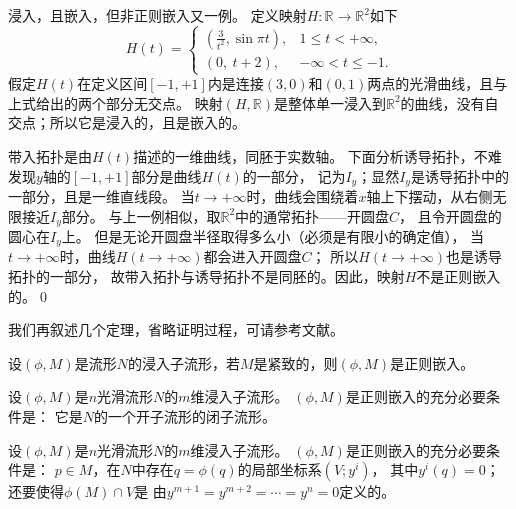 \begin{example}\label{chdm:exm_iec3}
    浸入，且嵌入，但非正则嵌入又一例。
    定义映射$H:\mathbb{R}\to \mathbb{R}^2$如下
    \begin{equation}
        H(t)=\begin{cases}
           \left(\frac{3}{t^2},\sin\pi t \right), & 1 \leqslant t < +\infty, \\
           \left(0,\ t+2\right), & -\infty < t \leqslant -1.
        \end{cases}
    \end{equation}
    假定$H(t)$在定义区间$[-1,+1]$内是连接$(3,0)$和$(0,1)$两点的光滑曲线，且与上式给出的两个部分无交点。
    映射$(H,\mathbb{R})$是整体单一浸入到$\mathbb{R}^2$的曲线，没有自交点；所以它是浸入的，且是嵌入的。
    
    带入拓扑是由$H(t)$描述的一维曲线，同胚于实数轴。
    下面分析诱导拓扑，不难发现$y$轴的$[-1,+1]$部分是曲线$H(t)$的一部分，
    记为$I_y$；显然$I_y$是诱导拓扑中的一部分，且是一维直线段。
    当$t\to +\infty$时，曲线会围绕着$x$轴上下摆动，从右侧无限接近$I_y$部分。
    与上一例相似，取$\mathbb{R}^2$中的通常拓扑——开圆盘$C$，
    且令开圆盘的圆心在$I_y$上。
    但是无论开圆盘半径取得多么小（必须是有限小的确定值），
    当$t\to +\infty$时，曲线$H(t\to +\infty)$都会进入开圆盘$C$；
    所以$H(t\to +\infty)$也是诱导拓扑的一部分，
    故带入拓扑与诱导拓扑不是同胚的。因此，映射$H$不是正则嵌入的。\qed
\end{example}

我们再叙述几个定理，省略证明过程，可请参考文献\parencite[\S 1.3]{cc2001-zh}。
\begin{theorem}\label{chdm:thm_embed-1}
    设$(\phi,M)$是流形$N$的浸入子流形，若$M$是紧致的，则$(\phi,M)$是正则嵌入。
\end{theorem}

\begin{theorem}\label{chdm:thm_embed-2}
    设$(\phi,M)$是$n$光滑流形$N$的$m$维浸入子流形。
    $(\phi,M)$是正则嵌入的充分必要条件是：
    它是$N$的一个开子流形的闭子流形。
\end{theorem}

\begin{theorem}\label{chdm:thm_embed-3}
    设$(\phi,M)$是$n$光滑流形$N$的$m$维浸入子流形。
    $(\phi,M)$是正则嵌入的充分必要条件是：
    $p\in M$，在$N$中存在$q=\phi(q)$的局部坐标系$(V;y^i)$，
    其中$y^i(q)=0$；还要使得$\phi(M)\cap V$是
    由$y^{m+1}=y^{m+2}=\cdots=y^{n}=0$定义的。
\end{theorem}

